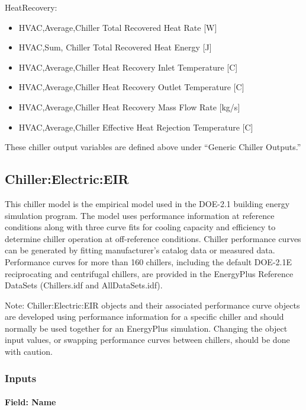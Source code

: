 HeatRecovery:

\begin{itemize}
\item
  HVAC,Average,Chiller Total Recovered Heat Rate {[}W{]}
\item
  HVAC,Sum, Chiller Total Recovered Heat Energy {[}J{]}
\item
  HVAC,Average,Chiller Heat Recovery Inlet Temperature {[}C{]}
\item
  HVAC,Average,Chiller Heat Recovery Outlet Temperature {[}C{]}
\item
  HVAC,Average,Chiller Heat Recovery Mass Flow Rate {[}kg/s{]}
\item
  HVAC,Average,Chiller Effective Heat Rejection Temperature {[}C{]}
\end{itemize}

These chiller output variables are defined above under ``Generic Chiller Outputs.''

\subsection{Chiller:Electric:EIR}\label{chillerelectriceir}

This chiller model is the empirical model used in the DOE-2.1 building energy simulation program. The model uses performance information at reference conditions along with three curve fits for cooling capacity and efficiency to determine chiller operation at off-reference conditions. Chiller performance curves can be generated by fitting manufacturer's catalog data or measured data. Performance curves for more than 160 chillers, including the default DOE-2.1E reciprocating and centrifugal chillers, are provided in the EnergyPlus Reference DataSets (Chillers.idf and AllDataSets.idf).

Note: Chiller:Electric:EIR objects and their associated performance curve objects are developed using performance information for a specific chiller and should normally be used together for an EnergyPlus simulation. Changing the object input values, or swapping performance curves between chillers, should be done with caution.

\subsubsection{Inputs}\label{inputs-4-023}

\paragraph{Field: Name}\label{field-name-4-020}

